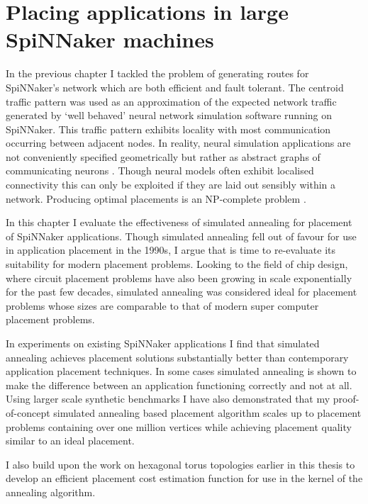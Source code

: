 \chapter{Placing applications in large SpiNNaker machines}
	
	\label{sec:placement}
	
	In the previous chapter I tackled the problem of generating routes for
	SpiNNaker's network which are both efficient and fault tolerant. The centroid
	traffic pattern was used as an approximation of the expected network traffic
	generated by `well behaved' neural network simulation software running on
	SpiNNaker. This traffic pattern exhibits locality with most communication
	occurring between adjacent nodes.  In reality, neural simulation applications
	are not conveniently specified geometrically but rather as abstract graphs of
	communicating neurons \cite{davison08,eliasmith13}. Though neural models
	often exhibit localised connectivity this can only be exploited if they are
	laid out sensibly within a network. Producing optimal placements is an
	NP-complete problem \cite{hoefler11}.
	
	In this chapter I evaluate the effectiveness of simulated annealing
	\cite{kirkpatrick83} for placement of SpiNNaker applications. Though
	simulated annealing fell out of favour for use in application placement in
	the 1990s, I argue that is time to re-evaluate its suitability for modern
	placement problems. Looking to the field of chip design, where circuit
	placement problems have also been growing in scale exponentially for the past
	few decades, simulated annealing was considered ideal for placement problems
	whose sizes are comparable to that of modern super computer placement
	problems.
	
	In experiments on existing SpiNNaker applications I find that simulated
	annealing achieves placement solutions substantially better than contemporary
	application placement techniques. In some cases simulated annealing is shown
	to make the difference between an application functioning correctly and not
	at all. Using larger scale synthetic benchmarks I have also demonstrated that
	my proof-of-concept simulated annealing based placement algorithm scales up
	to placement problems containing over one million vertices while achieving
	placement quality similar to an ideal placement.
	
	I also build upon the work on hexagonal torus topologies earlier in this
	thesis to develop an efficient placement cost estimation function for use in
	the kernel of the annealing algorithm.
	
